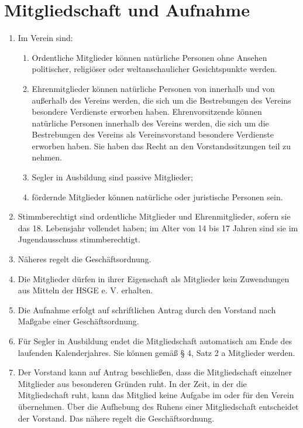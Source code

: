 \documentclass[10pt, twocolumn, parskip=half]{scrartcl}
\begin{document}
\section{ Mitgliedschaft und Aufnahme}
\begin{enumerate}[noitemsep]
	\item Im Verein sind:
		\begin{enumerate}[noitemsep]
			\item Ordentliche Mitglieder können natürliche Personen ohne Ansehen politischer, religiöser oder weltanschaulicher Gesichtspunkte werden.
			\item Ehrenmitglieder können natürliche Personen von innerhalb und von außerhalb des Vereins werden, die sich um die Bestrebungen des Vereins besondere Verdienste erworben haben. Ehrenvorsitzende können natürliche Personen innerhalb des Vereins werden, die sich um die Bestrebungen des Vereins als Vereinsvorstand besondere Verdienste erworben haben. Sie haben das Recht an den Vorstandssitzungen teil zu nehmen.
			\item Segler in Ausbildung sind passive Mitglieder;
			\item fördernde Mitglieder können natürliche oder juristische Personen sein.
		\end{enumerate}
	\item Stimmberechtigt sind ordentliche Mitglieder und Ehrenmitglieder, sofern sie das 18. Lebensjahr vollendet haben; im Alter von 14 bis 17 Jahren sind sie im Jugendausschuss stimmberechtigt.
	\item Näheres regelt die Geschäftsordnung.
	\item Die Mitglieder dürfen in ihrer Eigenschaft als Mitglieder kein Zuwendungen aus	Mitteln der HSGE e. V. erhalten.
	\item Die Aufnahme erfolgt auf schriftlichen Antrag durch den Vorstand nach Maßgabe einer Geschäftsordnung.
	\item Für Segler in Ausbildung endet die Mitgliedschaft automatisch am Ende des laufenden Kalenderjahres. Sie können gemäß § 4, Satz 2 a Mitglieder werden.
	\item Der Vorstand kann auf Antrag beschließen, dass die Mitgliedschaft einzelner Mitglieder aus besonderen Gründen ruht. In der Zeit, in der die Mitgliedschaft ruht, kann das Mitglied keine Aufgabe im oder für den Verein übernehmen. Über die Aufhebung des Ruhens einer Mitgliedschaft entscheidet der Vorstand. Das nähere regelt die Geschäftsordnung.
\end{enumerate}
\end{document}
